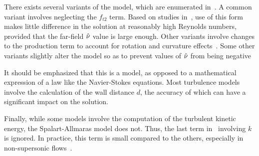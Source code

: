 There exists several variants of the model, which are enumerated in~\cite{tmrsa}. A common variant involves neglecting the $f_{t2}$ term. Based on studies in~\cite{rumsey2007apparent}, use of this form makes little difference in the solution at reasonably high Reynolds numbers, provided that the far-field $\sa$ value is large enough. Other variants involve changes to the production term to account for rotation and curvature effects~\cite{shur2000turbulence,dacles1995numerical,dacles1999numerical}. Some other variants slightly alter the model so as to prevent values of $\sa$ from being negative

It should be emphasized that this is a model, as opposed to a mathematical expression of a law like the Navier-Stokes equations. Most turbulence models involve the calculation of the wall distance $d$, the accuracy of which can have a significant impact on the solution.

Finally, while some models involve the computation of the turbulent kinetic energy, the Spalart-Allmaras model does not. Thus, the last term in~ involving $k$ is ignored. In practice, this term is small compared to the others, especially in non-supersonic flows~\cite{tmrsa}.
%